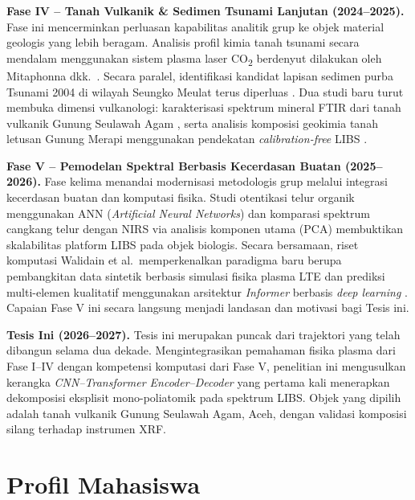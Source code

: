 \documentclass[12pt, a4paper]{article}
\begin{document}
\textbf{Fase IV -- Tanah Vulkanik \& Sedimen Tsunami Lanjutan (2024--2025).}
Fase ini mencerminkan perluasan kapabilitas analitik grup ke objek material geologis yang lebih beragam. Analisis profil kimia tanah tsunami secara mendalam menggunakan sistem plasma laser CO\textsubscript{2} berdenyut dilakukan oleh Mitaphonna dkk.\ \citep{mitaphonna_pulsed_2024}. Secara paralel, identifikasi kandidat lapisan sedimen purba Tsunami 2004 di wilayah Seungko Meulat terus diperluas \citep{mitaphonna_preliminary_2024}. Dua studi baru turut membuka dimensi vulkanologi: karakterisasi spektrum mineral FTIR dari tanah vulkanik Gunung Seulawah Agam \citep{aliandri_evaluation_2025}, serta analisis komposisi geokimia tanah letusan Gunung Merapi menggunakan pendekatan \textit{calibration-free} LIBS \citep{khumaeni_analysis_2025}.

\textbf{Fase V -- Pemodelan Spektral Berbasis Kecerdasan Buatan (2025--2026).}
Fase kelima menandai modernisasi metodologis grup melalui integrasi kecerdasan buatan dan komputasi fisika. Studi otentikasi telur organik menggunakan ANN (\textit{Artificial Neural Networks}) \citep{subki_analysis_2025} dan komparasi spektrum cangkang telur dengan NIRS via analisis komponen utama (PCA) \citep{qusthalani_comparing_2025} membuktikan skalabilitas platform LIBS pada objek biologis. Secara bersamaan, riset komputasi Walidain et al.\ memperkenalkan paradigma baru berupa pembangkitan data sintetik berbasis simulasi fisika plasma LTE \citep{walidain_spectroscopic_2025} dan prediksi multi-elemen kualitatif menggunakan arsitektur \textit{Informer} berbasis \textit{deep learning} \citep{walidain_informer-based_2026}. Capaian Fase V ini secara langsung menjadi landasan dan motivasi bagi Tesis ini.

\textbf{Tesis Ini (2026--2027).}
Tesis ini merupakan puncak dari trajektori yang telah dibangun selama dua dekade. Mengintegrasikan pemahaman fisika plasma dari Fase I--IV dengan kompetensi komputasi dari Fase V, penelitian ini mengusulkan kerangka \textit{CNN--Transformer Encoder--Decoder} yang pertama kali menerapkan dekomposisi eksplis\-it mono-poliatomik pada spektrum LIBS. Objek yang dipilih adalah tanah vulkanik Gunung Seulawah Agam, Aceh, dengan validasi komposisi silang terhadap instrumen XRF.


\newpage

\section{Profil Mahasiswa}
\end{document}
